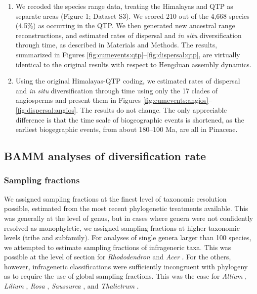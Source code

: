 \begin{enumerate}
\item We recoded the species range data, treating the Himalayas and
  QTP as separate areas (Figure 1; Dataset S3). We scored 210 out of
  the 4,668 species (4.5\%) as occurring in the QTP. We then generated
  new ancestral range reconstructions, and estimated rates of
  dispersal and \textit{in situ} diversification through time, as
  described in Materials and Methods. The results, summarized in
  Figures \ref{fig:cumevents:qtp}--\ref{fig:dispersal:qtp}, are
  virtually identical to the original results with respect to Hengduan
  assembly dynamics.

\item Using the original Himalayas-QTP coding, we estimated rates of
  dispersal and \textit{in situ} diversification through time using
  only the 17 clades of angiosperms and present them in Figures
  \ref{fig:cumevents:angios}--\ref{fig:dispersal:angios}. The results
  do not change. The only appreciable difference is that the time
  scale of biogeographic events is shortened, as the earliest
  biogegraphic events, from about 180--100 Ma, are all in Pinaceae.

\end{enumerate}

\subsection*{BAMM analyses of diversification rate}

\subsubsection*{Sampling fractions}

We assigned sampling fractions at the finest level of taxonomic
resolution possible, estimated from the most recent phylogenetic
treatments available. This was generally at the level of genus, but in
cases where genera were not confidently resolved as monophyletic, we
assigned sampling fractions at higher taxonomic levels (tribe and
subfamily). For analyses of single genera larger than 100 species, we
attempted to estimate sampling fractions of infrageneric taxa. This
was possible at the level of section for \textit{Rhododendron}
\citep{fang1998} and \textit{Acer} \citep{xu2008}. For the others,
however, infrageneric classifications were sufficiently incongruent
with phylogeny as to require the use of global sampling
fractions. This was the case for \textit{Allium} \citep{li2010},
\textit{Lilium} \citep{gao2013}, \textit{Rosa} \citep{bruneau2007},
\textit{Saussurea} \citep{wang2009}, and \textit{Thalictrum}
\citep{soza2012}.

